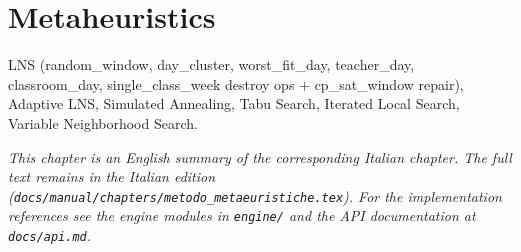 \chapter{Metaheuristics}
\label{ch:metodo_metaeuristiche_en}

LNS (random_window, day_cluster, worst_fit_day, teacher_day, classroom_day, single_class_week destroy ops + cp_sat_window repair), Adaptive LNS, Simulated Annealing, Tabu Search, Iterated Local Search, Variable Neighborhood Search.

\medskip
\noindent
\textit{This chapter is an English summary of the corresponding Italian chapter. The full text remains in the Italian edition (\texttt{docs/manual/chapters/metodo\_metaeuristiche.tex}). For the implementation references see the engine modules in \texttt{engine/} and the API documentation at \texttt{docs/api.md}.}
